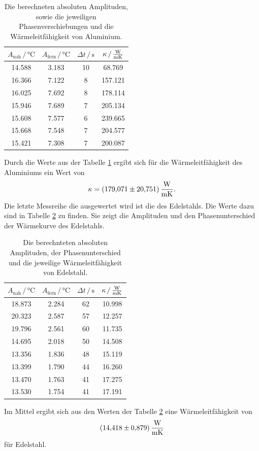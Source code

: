 \begin{table}
\centering
\caption{Die berechneten absoluten Amplituden, sowie die jeweiligen Phasenverschiebungen und die Wärmeleitfähigkeit von Aluminium.}
    \begin{tabular}{cccc}
    \toprule
    $A_\text{nah} \,/\, \si{\celsius}$ & $A_\text{fern} \,/\, \si{\celsius}$ & $\Delta t \,/\, \si{\second}$ & $\kappa \, / \, \si{\frac{\watt}{\meter\kelvin}}$ \\
    \midrule
    14.588 & 3.183 & 10 & 68.769 \\
    16.366 & 7.122 & 8  & 157.121 \\
    16.025 & 7.692 & 8  & 178.114 \\
    15.946 & 7.689 & 7  & 205.134 \\
    15.608 & 7.577 & 6  & 239.665 \\
    15.668 & 7.548 & 7  & 204.577 \\
    15.421 & 7.308 & 7  & 200.087 \\
    \bottomrule
    \end{tabular}
\label{tab:erg_alu}
\end{table}
Durch die Werte aus der Tabelle \ref{tab:erg_alu} ergibt sich für die Wärmeleitfähigkeit des Aluminiums ein Wert von 
\begin{equation*}
    \kappa = \SI{179.071(20751)}{\frac{\watt}{\meter\kelvin}} .
\end{equation*}
\FloatBarrier
Die letzte Messreihe die ausgewertet wird ist die des Edelstahls.
Die Werte dazu sind in Tabelle \ref{tab:erg_edel} zu finden. Sie zeigt die Amplituden und den Phasenunterschied der Wärmekurve des Edelstahls.
\begin{table}
\centering
\caption{Die berechnteten absoluten Amplituden, der Phasenunterschied und die jeweilige Wärmeleitfähigkeit von Edelstahl.}
\begin{tabular}{cccc}
    \toprule
    $A_\text{nah} \,/\, \si{\celsius}$ & $A_\text{fern} \,/\, \si{\celsius}$ & $\Delta t \,/\, \si{\second}$ & $\kappa \, / \, \si{\frac{\watt}{\meter\kelvin}}$ \\
    \midrule
    18.873 & 2.284 & 62 & 10.998 \\
    20.323 & 2.587 & 57 & 12.257 \\
    19.796 & 2.561 & 60 & 11.735 \\
    14.695 & 2.018 & 50 & 14.508 \\
    13.356 & 1.836 & 48 & 15.119 \\
    13.399 & 1.790 & 44 & 16.260 \\
    13.470 & 1.763 & 41 & 17.275 \\
    13.530 & 1.754 & 41 & 17.191 \\
    \bottomrule
\end{tabular}
\label{tab:erg_edel}
\end{table}

Im Mittel ergibt sich aus den Werten der Tabelle \ref{tab:erg_edel} eine Wärmeleitfähigkeit von
\begin{equation*}
    \SI{14.418(879)}{\frac{\watt}{\meter\kelvin}}
\end{equation*} 
für Edelstahl.

\FloatBarrier